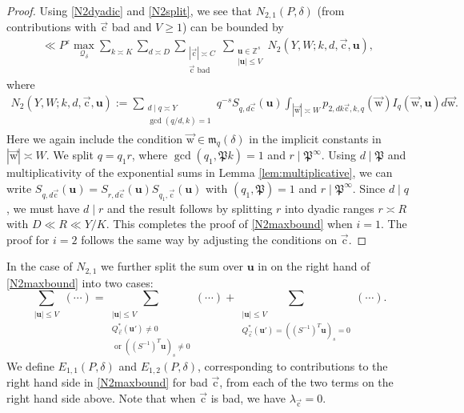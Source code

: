 \documentclass[letterpaper,11pt]{amsart}
\numberwithin{equation}{section}
\theoremstyle{definition}
\numberwithin{equation}{section}
\newcommand{\ZZ}{\mathbb{Z}}
\newcommand{\uu}{\mathbf{u}}
\newcommand{\uw}{{\vec{\mathrm{w}}}}
\newcommand{\uc}{{\vec{\mathrm{c}}}}
\newcommand{\ve}{\varepsilon}
\begin{document}
\begin{proof}  

Using \eqref{N2dyadic} and \eqref{N2split}, we see that $N_{2,1}(P, \delta)$ (from contributions with $\uc $ bad and $V\geq 1$) can be bounded by 
 \begin{align*}
\ll P^{\ve}\max_{\mathcal{Q}_\delta}\sum_{k\asymp K}\sum_{d\asymp D}\sum_{\substack{|\uc| \asymp C\\ \uc \text{ bad}}}\sum_{\substack{\uu \in \ZZ^s\\ |\uu|\leq V}} N_2(Y, W; k,d, \uc, \uu),
 \end{align*}
 where 
 \begin{align*}
 N_2(Y, W; k, d, \uc, \uu):=\sum_{\substack{d\mid q\asymp Y\\  \gcd(q/d, k)=1}} q^{-s}S_{q, d\uc}(\uu) \int_{|\uw|\asymp W}p_{2, dk \uc, k, q}(\uw) I_{q}(\uw, \uu)d\uw.
 \end{align*}
 Here we again include the condition $\uw\in \mathfrak m_q(\delta)$ in the implicit constants in $|\uw|\asymp W$. 
We split $q=q_1r$, where $\gcd(q_1,\mathfrak{P}k)=1$ and $r\mid \mathfrak{P}^\infty$. Using $d\mid \mathfrak P$ and multiplicativity of the exponential sums in Lemma \ref{lem:multiplicative}, we can write $S_{q, d\uc}(\uu)=S_{r, d\uc}(\uu)S_{q_1, \uc}(\uu)$ with $(q_1,\mathfrak P)=1$ and $r\mid \mathfrak P^\infty$. Since $d\mid q$, we must have $d\mid r$ and the result follows by splitting $r$ into dyadic ranges $r\asymp R$ with $D\ll R\ll Y/K$. This completes the proof of \eqref{N2maxbound} when $i=1$. The proof for $i=2$ follows the same way by adjusting the conditions on $\uc$. 
 \end{proof}
 
In the case of $N_{2,1}$ we further split the sum over $\uu$ in on the right hand of \eqref{N2maxbound} into two cases:
\begin{equation}\label{E-one}
\sum_{\substack{|\uu|\leq V}} (\cdots)
=\sum_{\substack{|\uu|\leq V\\ Q_\uc^*(\uu')\neq 0\\ \textrm{ or }((S^{-1})^T\uu)_s\neq 0}}(\cdots)+\sum_{\substack{|\uu|\leq V\\ Q_\uc^*(\uu')=((S^{-1})^T\uu)_s= 0}}(\cdots).
\end{equation}
We define \(E_{1,1}(P, \delta)\) and \(E_{1,2}(P, \delta)\), corresponding to contributions to the right hand side in \eqref{N2maxbound} for bad $\uc$, from each of the two terms on the right hand side above. Note that when $\uc$ is bad, we have $\lambda_{\uc}=0$.
\end{document}
